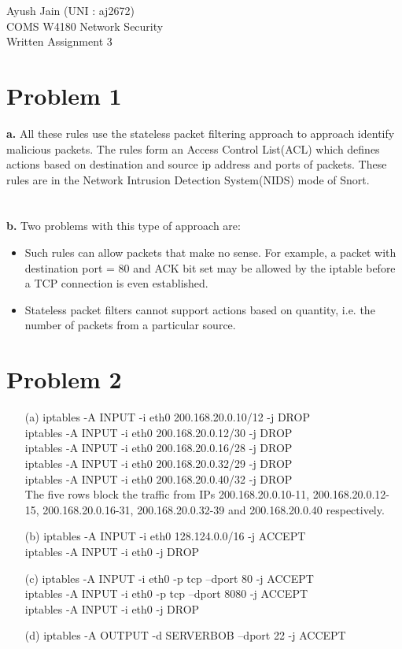 \documentclass[10pt]{article}
\begin{document}
\vspace*{\fill}
\begin{Huge}
\begin{center}
Ayush Jain (UNI : aj2672)\\
COMS W4180 Network Security\\
Written Assignment 3\\
\end{center}
\end{Huge}
\vspace*{\fill}
\newpage
\section{Problem 1}
\textbf{a.} All these rules use the stateless packet filtering approach to approach identify malicious packets. The rules form an Access Control List(ACL) which defines actions based on destination and source ip address and ports of packets. These rules are in the Network Intrusion Detection System(NIDS) mode of Snort.\\\\\\
\textbf{b.} Two problems with this type of approach are:
\begin{itemize}
\item Such rules can allow packets that make no sense. For example, a packet with destination port = 80 and ACK bit set may be allowed by the iptable before a TCP connection is even established.
\item Stateless packet filters cannot support actions based on quantity, i.e. the number of packets from a particular source. 
\end{itemize}
\section{Problem 2}
\begin{enumerate}
\item[(a)]
iptables -A INPUT -i eth0 200.168.20.0.10/12 -j DROP\\
iptables -A INPUT -i eth0 200.168.20.0.12/30 -j DROP\\
iptables -A INPUT -i eth0 200.168.20.0.16/28 -j DROP\\
iptables -A INPUT -i eth0 200.168.20.0.32/29 -j DROP\\
iptables -A INPUT -i eth0 200.168.20.0.40/32 -j DROP\\
The five rows block the traffic from IPs 200.168.20.0.10-11, 200.168.20.0.12-15, 200.168.20.0.16-31, 200.168.20.0.32-39 and 200.168.20.0.40 respectively.
\item[(b)] iptables -A INPUT -i eth0 128.124.0.0/16 -j ACCEPT\\
iptables -A INPUT -i eth0 -j DROP
\item[(c)] iptables -A INPUT -i eth0 -p tcp –dport 80 -j ACCEPT\\
iptables -A INPUT -i eth0 -p tcp –dport 8080 -j ACCEPT\\
iptables -A INPUT -i eth0 -j DROP
\item[(d)] iptables -A OUTPUT -d SERVERBOB –dport 22 -j ACCEPT
\end{enumerate}
\end{document}
